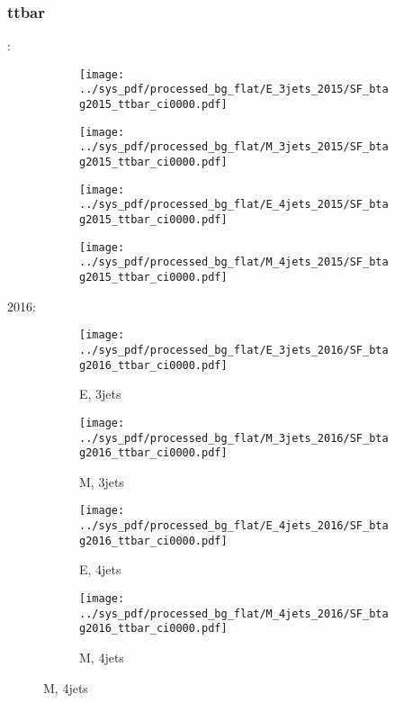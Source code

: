 \documentclass{beamer}
\begin{document}
\begin{frame}
\frametitle{ttbar}
\fontsize{5}{1}:
\begin{figure}
\centering
\begin{subfigure}[b]{0.24\textwidth}
\texttt{[image: ../sys\_pdf/processed\_bg\_flat/E\_3jets\_2015/SF\_btag2015\_ttbar\_ci0000.pdf]}
\end{subfigure}
\begin{subfigure}[b]{0.24\textwidth}
\texttt{[image: ../sys\_pdf/processed\_bg\_flat/M\_3jets\_2015/SF\_btag2015\_ttbar\_ci0000.pdf]}
\end{subfigure}
\begin{subfigure}[b]{0.24\textwidth}
\texttt{[image: ../sys\_pdf/processed\_bg\_flat/E\_4jets\_2015/SF\_btag2015\_ttbar\_ci0000.pdf]}
\end{subfigure}
\begin{subfigure}[b]{0.24\textwidth}
\texttt{[image: ../sys\_pdf/processed\_bg\_flat/M\_4jets\_2015/SF\_btag2015\_ttbar\_ci0000.pdf]}
\end{subfigure}
\end{figure}
2016:
\begin{figure}
\centering
\begin{subfigure}[b]{0.24\textwidth}
\texttt{[image: ../sys\_pdf/processed\_bg\_flat/E\_3jets\_2016/SF\_btag2016\_ttbar\_ci0000.pdf]}
\captionsetup{font=tiny}
\caption{E, 3jets}
\end{subfigure}
\begin{subfigure}[b]{0.24\textwidth}
\texttt{[image: ../sys\_pdf/processed\_bg\_flat/M\_3jets\_2016/SF\_btag2016\_ttbar\_ci0000.pdf]}
\captionsetup{font=tiny}
\caption{M, 3jets}
\end{subfigure}
\begin{subfigure}[b]{0.24\textwidth}
\texttt{[image: ../sys\_pdf/processed\_bg\_flat/E\_4jets\_2016/SF\_btag2016\_ttbar\_ci0000.pdf]}
\captionsetup{font=tiny}
\caption{E, 4jets}
\end{subfigure}
\begin{subfigure}[b]{0.24\textwidth}
\texttt{[image: ../sys\_pdf/processed\_bg\_flat/M\_4jets\_2016/SF\_btag2016\_ttbar\_ci0000.pdf]}
\captionsetup{font=tiny}
\caption{M, 4jets}
\end{subfigure}
\end{figure}
\end{frame}
\end{document}
